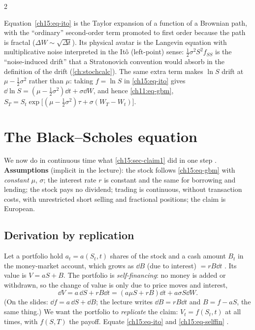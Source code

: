 \begin{paracol}{2}
\begin{intuition}
Equation~\eqref{ch15:eq-ito} is the Taylor expansion of a function of a Brownian path, with the ``ordinary'' second-order term promoted to first order
because the path is fractal ($\Delta W\sim\sqrt{\Delta t}$). Its physical avatar is the Langevin equation with multiplicative noise interpreted in the It\^o
(left-point) sense: $\tfrac12\sigma^2S^2f_{SS}$ is the ``noise-induced drift'' that a Stratonovich convention would absorb in the definition of the drift
(\cref{ch:stochcalc}). The same extra term makes $\ln S$ drift at $\mu-\tfrac12\sigma^2$ rather than $\mu$: taking $f=\ln S$ in \eqref{ch15:eq-ito}
gives $\dd\ln S=(\mu-\tfrac12\sigma^2)\dd t+\sigma\dd W$, and hence \cref{ch11:eq-gbm},
$S_T=S_t\exp\bigl[(\mu-\tfrac12\sigma^2)\tau+\sigma(W_T-W_t)\bigr]$.
\end{intuition}

\section{The Black--Scholes equation}\label{ch15:sec-pde}
We now do in continuous time what \cref{ch15:sec-claim1} did in one step . \textbf{Assumptions} (implicit in the lecture): the
stock follows \eqref{ch15:eq-gbm} with \emph{constant} $\mu$, $\sigma$; the interest rate $r$ is constant and the same for borrowing and lending; the stock
pays no dividend; trading is continuous, without transaction costs, with unrestricted short selling and fractional positions; the claim is European.

\subsection{Derivation by replication}
Let a portfolio hold $a_t=a(S_t,t)$ shares of the stock and a cash amount $B_t$ in the money-market account, which grows as
$\dd B$ (due to interest) $=rB\dd t$ . Its value is $V=aS+B$. The portfolio is \emph{self-financing}: no money is added or withdrawn,
so the change of value is only due to price moves and interest,
\begin{equation}\label{ch15:eq-selffin}
  \dd V=a\,\dd S+rB\dd t=(a\mu S+rB)\dd t+a\sigma S\dd W .
\end{equation}
(On the slides: $\dd f=a\,\dd S+\dd B$; the lecture writes $\dd B=rB\dd t$ and $B=f-aS$, the same thing.) We want the portfolio to \emph{replicate} the claim:
$V_t=f(S_t,t)$ at all times, with $f(S,T)$ the payoff. Equate \eqref{ch15:eq-ito} and \eqref{ch15:eq-selffin} .


\end{paracol}
